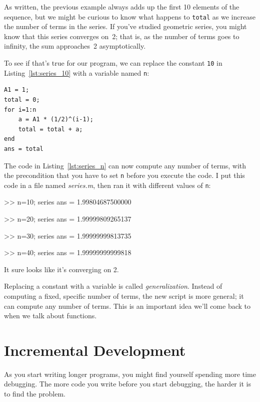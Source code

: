 
As written, the previous example always adds up the first 10
elements of the sequence, but we might be curious to know what
happens to \lstinline{total} as we increase the
number of terms in the series.  If you've studied geometric
series, you might know that this series converges on~2; that is,
as the number of terms goes to infinity, the sum approaches~2 asymptotically.

To see if that's true for our program, we can replace the
constant \lstinline{10} in Listing~\ref{lst:series_10} with a variable named \lstinline{n}:

\begin{lstlisting}[caption={Updating our code from Listing~\ref{lst:series_10} to have a variable number of terms}, label={lst:series_n}]
A1 = 1;
total = 0;
for i=1:n
    a = A1 * (1/2)^(i-1);
    total = total + a;
end
ans = total
\end{lstlisting}

The code in Listing~\ref{lst:series_n} can now compute any number of terms, with the
precondition that you have to set \lstinline{n} before you execute
the code.
I put this code in a file named \emph{series.m}, then
ran it with different values of \lstinline{n}:

\begin{code}
>> n=10; series
ans = 1.99804687500000

>> n=20; series
ans = 1.99999809265137

>> n=30; series
ans = 1.99999999813735

>> n=40; series
ans = 1.99999999999818
\end{code}

It sure looks like it's converging on 2.

Replacing a constant with a variable is called \emph{generalization}.
Instead of computing a fixed, specific number of terms, the new script
is more general; it can compute any number of terms.
This is an important idea we'll come back to when we talk about functions.

\section{Incremental Development}


As you start writing longer programs, you might find yourself spending more time debugging.
The more code you write before you start debugging, the harder it is to find
the problem.

